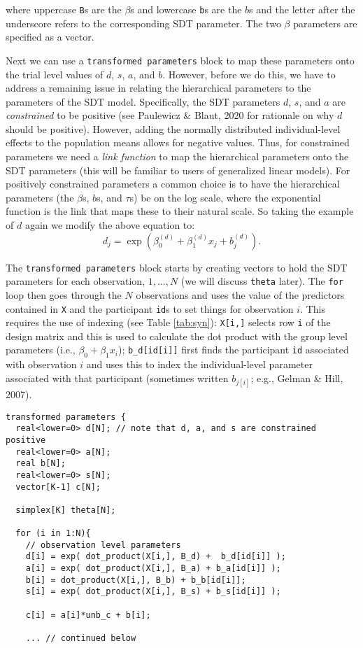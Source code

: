 \documentclass[
  english,
  ,man,floatsintext]{apa6}
\begin{document}
where uppercase \texttt{B}s are the \(\beta\)s and lowercase \texttt{b}s are the \(b\)s and the letter after the underscore refers to the corresponding SDT parameter. The two \(\beta\) parameters are specified as a vector.

Next we can use a \texttt{transformed\ parameters} block to map these parameters onto the trial level values of \(d\), \(s\), \(a\), and \(b\). However, before we do this, we have to address a remaining issue in relating the hierarchical parameters to the parameters of the SDT model. Specifically, the SDT parameters \(d\), \(s\), and \(a\) are \emph{constrained} to be positive (see Paulewicz \& Blaut, 2020 for rationale on why \(d\) should be positive). However, adding the normally distributed individual-level effects to the population means allows for negative values. Thus, for constrained parameters we need a \emph{link function} to map the hierarchical parameters onto the SDT parameters (this will be familiar to users of generalized linear models). For positively constrained parameters a common choice is to have the hierarchical parameters (the \(\beta\)s, \(b\)s, and \(\tau\)s) be on the log scale, where the exponential function is the link that maps these to their natural scale. So taking the example of \(d\) again we modify the above equation to:
\[
d_{j} = \exp\left(\beta_{0}^{(d)} + \beta_{1}^{(d)}x_j + b^{(d)}_{j}\right).
\]

The \texttt{transformed\ parameters} block starts by creating vectors to hold the SDT parameters for each observation, \(1,...,N\) (we will discuss \texttt{theta} later). The \texttt{for} loop then goes through the \(N\) observations and uses the value of the predictors contained in \texttt{X} and the participant \texttt{id}s to set things for observation \(i\). This requires the use of indexing (see Table \ref{tab:syn}): \texttt{X{[}i,{]}} selects row \texttt{i} of the design matrix and this is used to calculate the dot product with the group level parameters (i.e., \(\beta_0 + \beta_1x_i\)); \texttt{b\_d{[}id{[}i{]}{]}} first finds the participant \texttt{id} associated with observation \(i\) and uses this to index the individual-level parameter associated with that participant (sometimes written \(b_{j[i]}\); e.g., Gelman \& Hill, 2007).

\begin{verbatim}
transformed parameters {
  real<lower=0> d[N]; // note that d, a, and s are constrained positive
  real<lower=0> a[N]; 
  real b[N];
  real<lower=0> s[N];
  vector[K-1] c[N];
  
  simplex[K] theta[N];

  for (i in 1:N){
    // observation level parameters
    d[i] = exp( dot_product(X[i,], B_d) +  b_d[id[i]] );
    a[i] = exp( dot_product(X[i,], B_a) + b_a[id[i]] );
    b[i] = dot_product(X[i,], B_b) + b_b[id[i]];
    s[i] = exp( dot_product(X[i,], B_s) + b_s[id[i]] );
    
    c[i] = a[i]*unb_c + b[i];

    ... // continued below
\end{verbatim}
\end{document}
